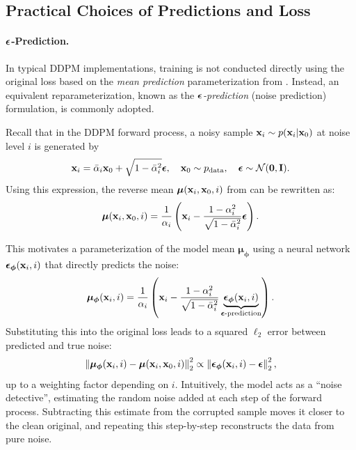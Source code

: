 \subsection{Practical Choices of Predictions and Loss}\label{subsec:ddpm-prediction}

\paragraph{${\bm{\epsilon}}$-Prediction.}
In typical DDPM implementations, training is not conducted directly using the original loss based on the \emph{mean prediction} parameterization from . Instead, an equivalent reparameterization, known as the \emph{${\bm{\epsilon}}$-prediction} (noise prediction) formulation, is commonly adopted.  

Recall that in the DDPM forward process, a noisy sample ${\mathbf{x}}_i \sim p({\mathbf{x}}_i |{\mathbf{x}}_0)$ at noise level $i$ is generated by
\begin{equation}\label{eq:ddpm-perturbation}
    {\mathbf{x}}_i = \bar{\alpha}_i {\mathbf{x}}_0 + \sqrt{1 - \bar{\alpha}_i^2}   \boldsymbol{\epsilon}, \quad {\mathbf{x}}_0 \sim p_{\text{data}}, \quad \boldsymbol{\epsilon} \sim \mathcal{N}(\mathbf{0}, \mathbf{I}).
\end{equation}
Using this expression, the reverse mean $\bm{\mu}({\mathbf{x}}_i, {\mathbf{x}}_0, i)$ from  can be rewritten as:
\[
\bm{\mu}({\mathbf{x}}_i, {\mathbf{x}}_0, i) = \frac{1}{\alpha_i} \left( {\mathbf{x}}_i - \frac{1 - \alpha_i^2}{\sqrt{1 - \bar{\alpha}_i^2}} \boldsymbol{\epsilon} \right).
\]

This motivates a parameterization of the model mean $\bm{\mu}_{\bm{\phi}}$ using a neural network $\boldsymbol{\epsilon}_{\bm{\phi}}({\mathbf{x}}_i, i)$ that directly predicts the noise:
\[
\bm{\mu}_{\bm{\phi}}({\mathbf{x}}_i, i) = \frac{1}{\alpha_i} \left( {\mathbf{x}}_i - \frac{1 - \alpha_i^2}{\sqrt{1 - \bar{\alpha}_i^2}} \underbrace{\boldsymbol{\epsilon}_{\bm{\phi}}({\mathbf{x}}_i, i)}_{{\bm{\epsilon}}\text{-prediction}} \right).
\]
Substituting this into the original loss leads to a squared $\ell_2$ error between predicted and true noise:
\[
\left\| \bm{\mu}_{\bm{\phi}}({\mathbf{x}}_i, i) - \bm{\mu}({\mathbf{x}}_i, {\mathbf{x}}_0, i) \right\|_2^2 \propto \left\| \boldsymbol{\epsilon}_{\bm{\phi}}({\mathbf{x}}_i, i) - \boldsymbol{\epsilon} \right\|_2^2,
\]
up to a weighting factor depending on $i$. Intuitively, the model acts as a ``noise detective'', estimating the random noise added at each step of the forward process. Subtracting this estimate from the corrupted sample moves it closer to the clean original, and repeating this step-by-step reconstructs the data from pure noise.

